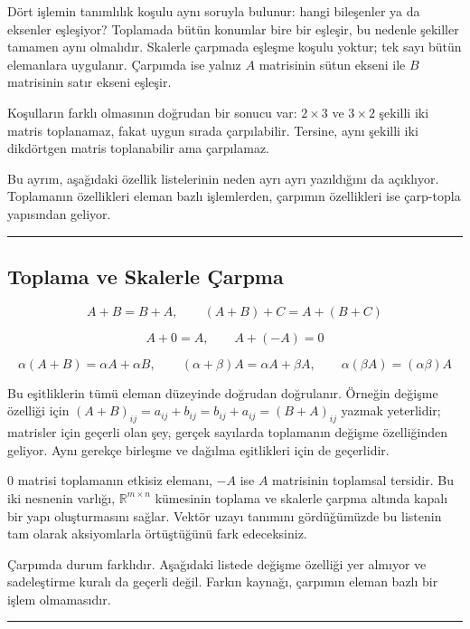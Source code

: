 \documentclass[
  letterpaper,
  DIV=11,
  numbers=noendperiod]{scrartcl}
\begin{document}
Dört işlemin tanımlılık koşulu aynı soruyla bulunur: hangi bileşenler ya
da eksenler eşleşiyor? Toplamada bütün konumlar bire bir eşleşir, bu
nedenle şekiller tamamen aynı olmalıdır. Skalerle çarpmada eşleşme
koşulu yoktur; tek sayı bütün elemanlara uygulanır. Çarpımda ise yalnız
\(A\) matrisinin sütun ekseni ile \(B\) matrisinin satır ekseni eşleşir.

Koşulların farklı olmasının doğrudan bir sonucu var: \(2\times3\) ve
\(3\times2\) şekilli iki matris toplanamaz, fakat uygun sırada
çarpılabilir. Tersine, aynı şekilli iki dikdörtgen matris toplanabilir
ama çarpılamaz.

Bu ayrım, aşağıdaki özellik listelerinin neden ayrı ayrı yazıldığını da
açıklıyor. Toplamanın özellikleri eleman bazlı işlemlerden, çarpımın
özellikleri ise çarp-topla yapısından geliyor.

\begin{center}\rule{0.5\linewidth}{0.5pt}\end{center}

\subsection{Toplama ve Skalerle
Çarpma}\label{toplama-ve-skalerle-uxe7arpma}

\[
A+B=B+A,
\qquad
(A+B)+C=A+(B+C)
\]

\[
A+0=A,
\qquad
A+(-A)=0
\]

\[
\alpha(A+B)=\alpha A+\alpha B,
\qquad
(\alpha+\beta)A=\alpha A+\beta A,
\qquad
\alpha(\beta A)=(\alpha\beta)A
\]

Bu eşitliklerin tümü eleman düzeyinde doğrudan doğrulanır. Örneğin
değişme özelliği için
\((A+B)_{ij}=a_{ij}+b_{ij}=b_{ij}+a_{ij}=(B+A)_{ij}\) yazmak yeterlidir;
matrisler için geçerli olan şey, gerçek sayılarda toplamanın değişme
özelliğinden geliyor. Aynı gerekçe birleşme ve dağılma eşitlikleri için
de geçerlidir.

\(0\) matrisi toplamanın etkisiz elemanı, \(-A\) ise \(A\) matrisinin
toplamsal tersidir. Bu iki nesnenin varlığı, \(\mathbb{R}^{m\times n}\)
kümesinin toplama ve skalerle çarpma altında kapalı bir yapı
oluşturmasını sağlar. Vektör uzayı tanımını gördüğümüzde bu listenin tam
olarak aksiyomlarla örtüştüğünü fark edeceksiniz.

Çarpımda durum farklıdır. Aşağıdaki listede değişme özelliği yer almıyor
ve sadeleştirme kuralı da geçerli değil. Farkın kaynağı, çarpımın eleman
bazlı bir işlem olmamasıdır.

\begin{center}\rule{0.5\linewidth}{0.5pt}\end{center}
\end{document}
